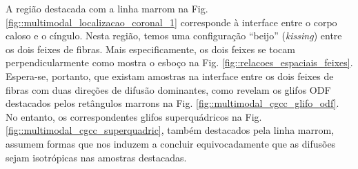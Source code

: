 A região destacada com a linha marrom na Fig. \ref{fig::multimodal_localizacao_coronal_1} corresponde à interface entre o corpo caloso e o cíngulo. Nesta região, temos uma configuração ``beijo'' (\textit{kissing}) entre os dois feixes de fibras.  Mais especificamente, os dois feixes se tocam perpendicularmente como mostra o esboço na Fig. \ref{fig::relacoes_espaciais_feixes}. Espera-se, portanto, que existam amostras na interface entre os dois feixes de fibras com duas direções de difusão dominantes, como revelam os glifos ODF destacados pelos retângulos marrons na Fig. \ref{fig::multimodal_cgcc_glifo_odf}. No entanto, os correspondentes glifos superquádricos na Fig. \ref{fig::multimodal_cgcc_superquadric}, também destacados pela linha marrom, assumem formas que nos induzem a concluir equivocadamente que as difusões sejam isotrópicas nas amostras destacadas. 







